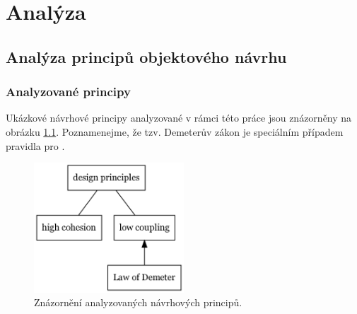 \chapter{Analýza}



\section{Analýza principů objektového návrhu}


\subsection{Analyzované principy}
Ukázkové návrhové principy analyzované v rámci této práce jsou znázorněny na obrázku \ref{analyzed_principles}. Poznamenejme, že tzv. Demeterův zákon je speciálním případem pravidla pro .

\begin{figure}[h!]
\centering
\includegraphics[width=0.5\textwidth]{./graphs/oop_design_principles.png}
\caption{Znázornění analyzovaných návrhových principů.\label{analyzed_principles}}
\end{figure}



